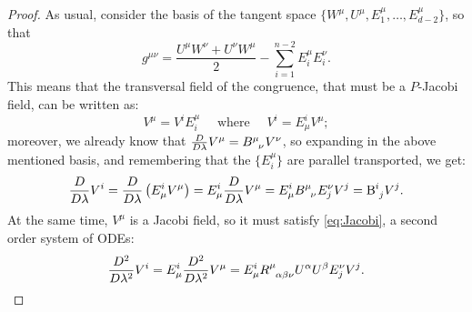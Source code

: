 	\begin{proof}
		As usual, consider the basis of the tangent space \(\{W^{\mu}, U^{\mu}, E_1^{\mu}, \ldots, E_{d - 2}^{\mu}\}\), so that
		\[
		g^{\mu\nu} = \frac{U^{\mu}W^{\nu} + U^{\nu}W^{\mu}}{2} - \sum_{i=1}^{n - 2}E_i^{\mu}E_i^{\nu}.
		\]
		This means that the transversal field of the congruence, that must be a \(P\)-Jacobi field, can be written as:
		\[
		V^{\mu} = V^iE_i^{\mu} \quad \text{ where } \quad V^i = E^i_{\mu}V^{\mu};
		\]
		moreover, we already know that \(\frac{D}{D\lambda}V^{\mu} = B\indices{^{\mu}_{\nu}}V^{\nu}\), so expanding in the above mentioned basis, and remembering that the \(\{E_i^{\mu}\}\) are parallel transported, we get:
		\begin{equation}
		\label{eq:1st-order-V_i}
			\frac{D}{D\lambda}V^i = \frac{D}{D\lambda}\left(E^i_{\mu}V^{\mu}\right) = E^i_{\mu}\frac{D}{D\lambda}V^{\mu} = E^i_{\mu}B\indices{^{\mu}_{\nu}}E_j^{\nu}V^j = \mathrm{B}\indices{^i_j}V^j.
		\end{equation}
		At the same time, \(V^{\mu}\) is a Jacobi field, so it must satisfy \eqref{eq:Jacobi}, a second order system of ODEs:
		\begin{equation}
			\label{eq:Jacobi-E_i}
			\frac{D^2}{D\lambda^2}V^i = E^i_{\mu}\frac{D^2}{D\lambda^2}V^{\mu} = E^i_{\mu}R\indices{^{\mu}_{\alpha\beta\nu}}U^{\alpha}U^{\beta}E_j^{\nu}V^j.
		\end{equation}
		

\end{proof}

